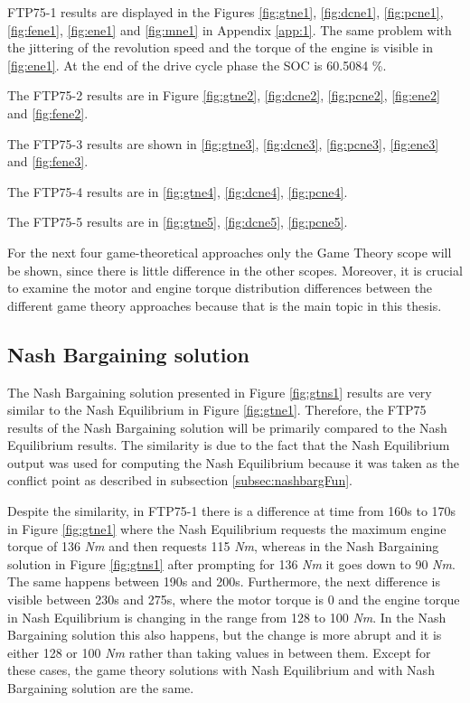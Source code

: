 FTP75-1 results are displayed in the Figures \ref{fig:gtne1}, \ref{fig:dcne1}, \ref{fig:pcne1}, \ref{fig:fene1}, \ref{fig:ene1} and \ref{fig:mne1} in Appendix \ref{app:1}. The same problem with the jittering of the revolution speed and the torque of the engine is visible in \ref{fig:ene1}. At the end of the drive cycle phase the SOC is 60.5084 \%.

The FTP75-2 results are in Figure \ref{fig:gtne2}, \ref{fig:dcne2}, \ref{fig:pcne2}, \ref{fig:ene2} and \ref{fig:fene2}. 

The FTP75-3 results are shown in \ref{fig:gtne3}, \ref{fig:dcne3}, \ref{fig:pcne3}, \ref{fig:ene3} and \ref{fig:fene3}. 

The FTP75-4 results are in \ref{fig:gtne4}, \ref{fig:dcne4}, \ref{fig:pcne4}.

The FTP75-5 results are in \ref{fig:gtne5}, \ref{fig:dcne5}, \ref{fig:pcne5}.

For the next four game-theoretical approaches only the Game Theory scope will be shown, since there is little difference in the other scopes. Moreover, it is crucial to examine the motor and engine torque distribution differences between the different game theory approaches because that is the main topic in this thesis.

\subsection{Nash Bargaining solution}
The Nash Bargaining solution presented in Figure \ref{fig:gtns1} results are very similar to the Nash Equilibrium in Figure \ref{fig:gtne1}. Therefore, the FTP75 results of the Nash Bargaining solution will be primarily compared to the Nash Equilibrium results. The similarity is due to the fact that the Nash Equilibrium output was used for computing the Nash Equilibrium because it was taken as the conflict point as described in subsection \ref{subsec:nashbargFun}.

Despite the similarity, in FTP75-1 there is a difference at time from 160s to 170s in Figure \ref{fig:gtne1} where the Nash Equilibrium requests the maximum engine torque of 136 \textit{Nm} and then requests 115 \textit{Nm}, whereas in the Nash Bargaining solution in Figure \ref{fig:gtns1} after prompting for 136 \textit{Nm} it goes down to 90 \textit{Nm}. The same happens between 190s and 200s. Furthermore, the next difference is visible between 230s and 275s, where the motor torque is 0 and the engine torque in Nash Equilibrium is changing in the range from 128 to 100 \textit{Nm}. In the Nash Bargaining solution this also happens, but the change is more abrupt and it is either 128 or 100 \textit{Nm} rather than taking values in between them. Except for these cases, the game theory solutions with Nash Equilibrium and with Nash Bargaining solution are the same.

